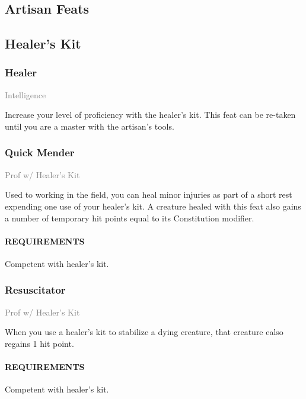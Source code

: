 
\subsection{Artisan Feats}
\subsection*{Healer's Kit}
    \subsubsection{Healer} \label{feat::healer}
    \small{\textcolor{gray}{Intelligence}} %

    \normalsize
    Increase your level of proficiency with the healer's kit.
    This feat can be re-taken until you are a master with the artisan's tools.

    \subsubsection{Quick Mender} \label{feat::quickmender}
    \small{\textcolor{gray}{Prof w/ Healer's Kit}}

    \normalsize
    Used to working in the field, you can heal minor injuries as part of a short rest expending one use of your healer's kit.
    A creature healed with this feat also gains a number of temporary hit points equal to its Constitution modifier.
    \paragraph{REQUIREMENTS} Competent with healer's kit.

    \subsubsection{Resuscitator} \label{feat::resuscitator}
    \small{\textcolor{gray}{Prof w/ Healer's Kit}}

    \normalsize
    When you use a healer's kit to stabilize a dying creature, that creature ealso regains 1 hit point.
    \paragraph{REQUIREMENTS} Competent with healer's kit.

